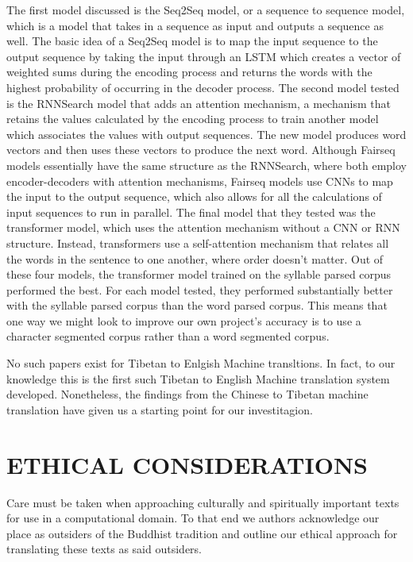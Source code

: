 \documentclass[letterpaper, 12 pt, conference]{ieeeconf}  %
\begin{document}
The first model discussed is the Seq2Seq model, or a sequence to sequence model, which is a model that takes in a sequence as input and outputs a sequence as well. The basic idea of a Seq2Seq model is to map the input sequence to the output sequence by taking the input through an LSTM which creates a vector of weighted sums during  the encoding process and returns the words with the highest probability of occurring in the decoder process. The second model tested is the RNNSearch model that adds an attention mechanism, a mechanism that retains the values calculated by the encoding process to train another model which associates the values with output sequences. The new model produces word vectors and then uses these vectors to produce the next word. Although Fairseq models essentially have the same structure as the RNNSearch, where both employ encoder-decoders with attention mechanisms, Fairseq models use CNNs to map the input to the output sequence, which also allows for all the calculations of input sequences to run in parallel. The final model that they tested was the transformer model, which uses the attention mechanism without a CNN or RNN structure. Instead, transformers use a self-attention mechanism that relates all the words in the sentence to one another, where order doesn't matter. Out of these four models, the transformer model trained on the syllable parsed corpus performed the best. For each model tested, they performed substantially better with the syllable parsed corpus than the word parsed corpus. This means that one way we might look to improve our own project’s accuracy is to use a character segmented corpus rather than a word segmented corpus. 

No such papers exist for Tibetan to Enlgish Machine transltions. In fact, to our knowledge this is the first such Tibetan to English Machine translation system developed.  Nonetheless, the findings from the Chinese to Tibetan machine translation have given us a starting point for our investitagion.  



\section{ETHICAL CONSIDERATIONS}

Care must be taken when approaching culturally and spiritually important texts for use in a computational domain. To that end we authors acknowledge our place as outsiders of the Buddhist tradition and outline our ethical approach for translating these texts as said outsiders.
\end{document}
